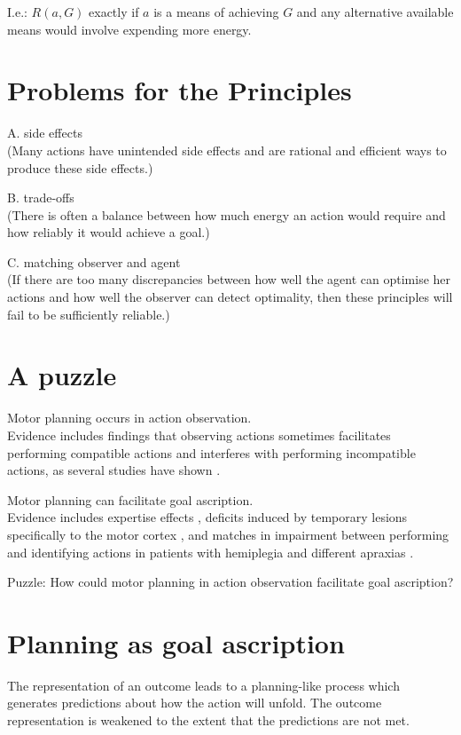 \documentclass[11pt]{extarticle}
\begin{document}
\begin{multicols}{3}
I.e.: $R(a,G)$ exactly if $a$ is a means of achieving $G$ and any alternative available means would involve expending more energy.

\section{Problems for the Principles}
A. side effects \\
(Many actions have unintended side effects and are rational and efficient ways to produce these side effects.)

B. trade-offs \\
(There is often a balance between how much energy an action would require and how reliably it would achieve a goal.)

C. matching observer and agent \\
(If there are too many discrepancies between
		how well the agent can optimise her actions
	and
		how well the observer can detect optimality,
then these principles will fail to be sufficiently reliable.)


\section{A puzzle}

Motor planning occurs in action observation. \\
Evidence includes findings that observing actions sometimes facilitates performing compatible actions and interferes with performing incompatible actions, as several studies have shown \citep{brass:2000_compatibility, craighero:2002_hand, kilner:2003_interference, costantini:2012_does}. 

Motor planning can facilitate goal ascription. \\
Evidence includes expertise effects \citep{casile:2006_nonvisual},
deficits induced by temporary lesions specifically to the motor cortex \citep{urgesi:2007_representation, moro:2008_neural},
and matches in impairment between performing and identifying actions in patients with
	hemiplegia \citet{serino:2009_lesions_}
	and different apraxias \citep{pazzaglia:2008_sound_}.

\newcommand{\thePuzzle}{How could motor planning in action observation facilitate goal ascription?  }
Puzzle: \thePuzzle 



\section{Planning as goal ascription}
The representation of an outcome leads to a planning-like process which generates predictions about how the action will unfold.
The outcome representation is weakened to the extent that the predictions are not met.  


\end{multicols}
\end{document}
